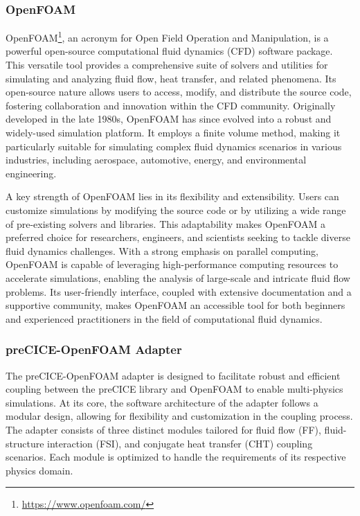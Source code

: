 \subsubsection{OpenFOAM}

OpenFOAM\footnote{\url{https://www.openfoam.com/}}, an acronym for Open Field Operation and Manipulation, is a powerful open-source computational fluid dynamics (CFD) software package. This versatile tool provides a comprehensive suite of solvers and utilities for simulating and analyzing fluid flow, heat transfer, and related phenomena. Its open-source nature allows users to access, modify, and distribute the source code, fostering collaboration and innovation within the CFD community. Originally developed in the late 1980s, OpenFOAM has since evolved into a robust and widely-used simulation platform. It employs a finite volume method, making it particularly suitable for simulating complex fluid dynamics scenarios in various industries, including aerospace, automotive, energy, and environmental engineering.

A key strength of OpenFOAM lies in its flexibility and extensibility. Users can customize simulations by modifying the source code or by utilizing a wide range of pre-existing solvers and libraries. This adaptability makes OpenFOAM a preferred choice for researchers, engineers, and scientists seeking to tackle diverse fluid dynamics challenges. With a strong emphasis on parallel computing, OpenFOAM is capable of leveraging high-performance computing resources to accelerate simulations, enabling the analysis of large-scale and intricate fluid flow problems. Its user-friendly interface, coupled with extensive documentation and a supportive community, makes OpenFOAM an accessible tool for both beginners and experienced practitioners in the field of computational fluid dynamics.

\subsubsection{preCICE-OpenFOAM Adapter}

The preCICE-OpenFOAM adapter \cite{Chourdakis:2023} is designed to facilitate robust and efficient coupling between the preCICE library and OpenFOAM to enable multi-physics simulations. At its core, the software architecture of the adapter follows a modular design, allowing for flexibility and customization in the coupling process. The adapter consists of three distinct modules tailored for fluid flow (FF), fluid-structure interaction (FSI), and conjugate heat transfer (CHT) coupling scenarios. Each module is optimized to handle the requirements of its respective physics domain.

